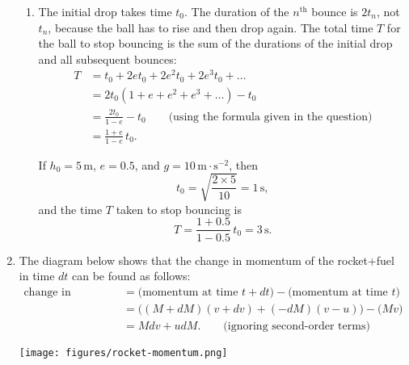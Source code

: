 \documentclass[12pt]{article}
\begin{document}
\begin{enumerate}
\begin{enumerate}
    \item The initial drop takes time $t_0$. The duration of the
      $n^{\text{th}}$ bounce is $2t_n$, not $t_n$, because the ball has to
      rise and then drop again. The total time $T$ for the ball to stop
      bouncing is the sum of the durations of the initial drop and all
      subsequent bounces:
      \begin{align*}
        T &= t_0 + 2 e t_0 + 2 e^2 t_0 + 2 e^3 t_0 + \ldots \\
          &= 2 t_0 (1 + e + e^2 + e^3 + \ldots) - t_0 \\
          &= \frac{2 t_0}{1 - e} - t_0
        \qquad \text{(using the formula given in the question)}\\
          &= \frac{1 + e}{1 - e} \, t_0.
      \end{align*}

      If $h_0 = 5\,$m, $e = 0.5$, and $g = 10\,\text{m}\cdot\text{s}^{-2}$,
      then
      \begin{displaymath}
        t_0 = \sqrt{\frac{2 \times 5}{10}} = 1\,\text{s},
      \end{displaymath}
      and the time $T$ taken to stop bouncing is
      \begin{displaymath}
        T = \frac{1 + 0.5}{1 - 0.5} \, t_0 = 3\,\text{s}.
      \end{displaymath}

    \end{enumerate}

\item The diagram below shows that the change in momentum of the
  rocket+fuel in time $dt$ can be found as follows:
  \begin{align*}
    \text{change in momentum}
    &= \text{(momentum at time $t + dt$)} - \text{(momentum at time $t$)} \\
    &=\big( (M + dM)(v + dv) + (-dM)(v-u) \big) - \big( Mv \big)\\
    &= M dv + u dM . \qquad \text{(ignoring second-order terms)}
  \end{align*}

  \begin{center}
    \texttt{[image: figures/rocket-momentum.png]}
  \end{center}
  

\end{enumerate}
\end{document}
